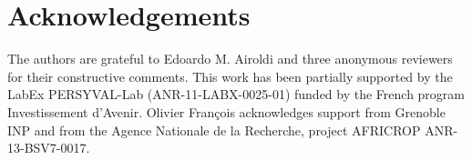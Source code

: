 \documentclass[12pt,aoas]{imsart} %
\numberwithin{equation}{section}
\theoremstyle{plain}
\theoremstyle{definition}
\begin{document}
\newpage

\section*{Acknowledgements}
The authors are grateful to Edoardo M. Airoldi and three anonymous reviewers for
their constructive comments.
This work has been partially supported by the LabEx PERSYVAL-Lab
(ANR-11-LABX-0025-01) funded by the French program Investissement d\rq{}Avenir.
Olivier Fran\c cois acknowledges support from Grenoble INP and from the Agence
Nationale de la Recherche, project AFRICROP ANR-13-BSV7-0017.





\end{document}
